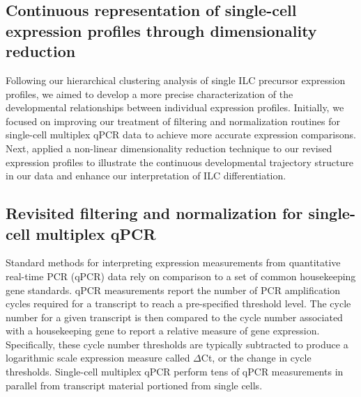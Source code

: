 

\begin{subappendices}

\section{Continuous representation of single-cell expression profiles through dimensionality reduction}

Following our hierarchical clustering analysis of single ILC precursor expression profiles, we aimed to develop a more precise characterization of the developmental relationships between individual expression profiles. Initially, we focused on improving our treatment of filtering and normalization routines for single-cell multiplex qPCR data to achieve more accurate expression comparisons. Next, applied a non-linear dimensionality reduction technique to our revised expression profiles to illustrate the continuous developmental trajectory structure in our data and enhance our interpretation of ILC differentiation.

\subsection{Revisited filtering and normalization for single-cell multiplex qPCR}

Standard methods for interpreting expression measurements from quantitative real-time PCR (qPCR) data rely on comparison to a set of common housekeeping gene standards. qPCR measurements report the number of PCR amplification cycles required for a transcript to reach a pre-specified threshold level. The cycle number for a given transcript is then compared to the cycle number associated with a housekeeping gene to report a relative measure of gene expression. Specifically, these cycle number thresholds are typically subtracted to produce a logarithmic scale expression measure called $\Delta$Ct, or the change in cycle thresholds. Single-cell multiplex qPCR perform tens of qPCR measurements in parallel from transcript material portioned from single cells.


\end{subappendices}
